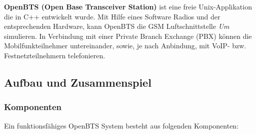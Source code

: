 \label{sec:openbts}
\textbf{OpenBTS (Open Base Transceiver Station)} ist eine freie Unix-Applikation die in C++ entwickelt wurde. Mit Hilfe eines Software Radios und der entsprechenden Hardware, kann OpenBTS die GSM Luftschnittstelle \textit{Um} simulieren. In Verbindung mit einer Private Branch Exchange (PBX) können die Mobilfunkteilnehmer untereinander, sowie, je nach Anbindung, mit VoIP- bzw. Festnetzteilnehmern telefonieren.

\subsection{Aufbau und Zusammenspiel}
\subsubsection{Komponenten}
Ein funktionsfähiges OpenBTS System besteht aus folgenden Komponenten:

